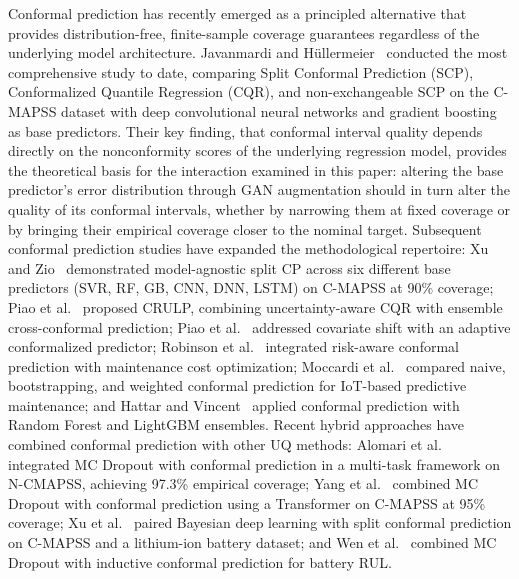 \documentclass[review]{elsarticle}
\begin{document}
Conformal prediction has recently emerged as a principled alternative
that provides distribution-free, finite-sample coverage guarantees
regardless of the underlying model architecture.
Javanmardi and H{\"u}llermeier~\cite{javanmardi_conformal_2023}
conducted the most comprehensive study to date, comparing Split
Conformal Prediction (SCP), Conformalized Quantile Regression (CQR),
and non-exchangeable SCP on the C-MAPSS dataset with deep
convolutional neural networks and gradient boosting as base
predictors. Their key finding, that conformal interval quality depends
directly on the nonconformity scores of the underlying regression
model, provides the theoretical basis for the interaction examined in
this paper: altering the base predictor's error distribution through
GAN augmentation should in turn alter the quality of its conformal
intervals, whether by narrowing them at fixed coverage or by bringing
their empirical coverage closer to the nominal target. Subsequent
conformal prediction studies
have expanded the methodological repertoire:
Xu and Zio~\cite{10381131} demonstrated model-agnostic split CP
across six different base predictors (SVR, RF, GB, CNN, DNN, LSTM)
on C-MAPSS at 90\% coverage;
Piao et al.~\cite{10816036} proposed CRULP, combining
uncertainty-aware CQR with ensemble cross-conformal prediction;
Piao et al.~\cite{11163867} addressed covariate shift with an
adaptive conformalized predictor;
Robinson et al.~\cite{robinson_remaining_2026} integrated risk-aware
conformal prediction with maintenance cost optimization;
Moccardi et al.~\cite{fi17060244} compared naive, bootstrapping, and
weighted conformal prediction for IoT-based predictive maintenance;
and Hattar and Vincent~\cite{11044907} applied conformal prediction
with Random Forest and LightGBM ensembles. Recent hybrid
approaches have combined conformal prediction with other UQ methods:
Alomari et al.~\cite{11488562} integrated MC Dropout with conformal
prediction in a multi-task framework on N-CMAPSS, achieving 97.3\%
empirical coverage;
Yang et al.~\cite{yang_uncertainty_2026} combined MC Dropout with
conformal prediction using a Transformer on C-MAPSS at 95\% coverage;
Xu et al.~\cite{xu_novel_2026} paired Bayesian deep learning with
split conformal prediction on C-MAPSS and a lithium-ion battery
dataset; and
Wen et al.~\cite{en19020414} combined MC Dropout with inductive
conformal prediction for battery RUL.\\
\end{document}
